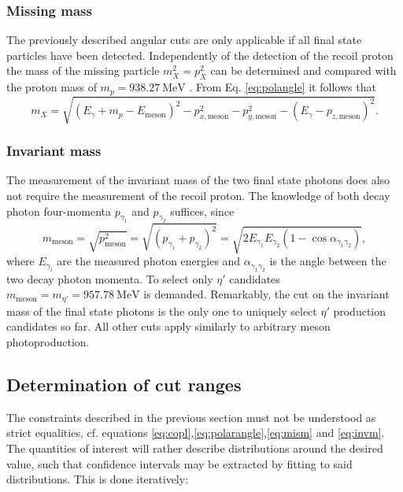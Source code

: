 \subsubsection{Missing mass}
The previously described angular cuts are only applicable if all final state particles have been detected. Independently of the detection of the recoil proton the mass of the missing particle $m_X^2=p_X^2$ can be determined and compared with the proton mass of $m_p=\SI{938.27}{\mega\eV}$ \cite{pdg}. From Eq. \eqref{eq:polangle} it follows that \begin{equation}
	m_X=\sqrt{(E_\gamma+m_p-E_\text{meson})^2-p_{x,\text{meson}}^2-p_{y,\text{meson}}^2-(E_\gamma-p_{z,\text{meson}})^2}.
	\label{eq:mism}
\end{equation}
\subsubsection{Invariant mass}
The measurement of the invariant mass of the two final state photons does also not require the measurement of the recoil proton. The knowledge of both decay photon four-momenta $p_{\gamma_1}$ and $p_{\gamma_2}$ suffices, since \begin{equation}
	m_\text{meson}=\sqrt{p_\text{meson}^2}=\sqrt{(p_{\gamma_1}+p_{\gamma_2})^2}=\sqrt{2E_{\gamma_1}E_{\gamma_2}(1-\cos\alpha_{\gamma_1\gamma_2})},
\label{eq:invm}
\end{equation}
where $E_{\gamma_i}$ are the measured photon energies and $\alpha_{\gamma_1\gamma_2}$ is the angle between the two decay photon momenta. To select only $\eta'$ candidates $m_\text{meson}=m_{\eta'}=\SI{957.78}{\mega\eV}$ is demanded. Remarkably, the cut on the invariant mass of the final state photons is the only one to uniquely select $\eta'$ production candidates so far. All other cuts apply similarly to arbitrary meson photoproduction.
\subsection{Determination of cut ranges}
The constraints described in the previous section must not be understood as strict equalities, cf. equations \eqref{eq:copl},\eqref{eq:polarangle},\eqref{eq:mism} and \eqref{eq:invm}. The quantities of interest will rather describe distributions around the desired value, such that confidence intervals may be extracted by fitting to said distributions. This is done iteratively:

